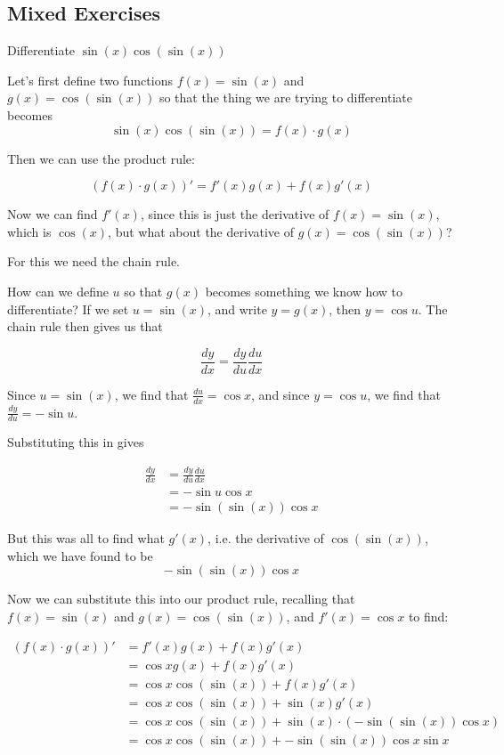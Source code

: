 \subsection{Mixed Exercises}
\begin{example}
    Differentiate $\sin(x)\cos(\sin(x))$
\end{example}
\begin{solution}
    Let's first define two functions $f(x) = \sin(x)$ and $g(x) = \cos(\sin(x))$ so that the thing we are trying to differentiate becomes
    \[ \sin(x)\cos(\sin(x)) = f(x) \cdot g(x)\]

    Then we can use the product rule:

    \[(f(x)\cdot g(x))' = f'(x)g(x) + f(x)g'(x)\]

    Now we can find $f'(x)$, since this is just the derivative of $f(x) = \sin(x)$, which is $\cos(x)$, but 
    what about the derivative of $g(x) = \cos(\sin(x))$?

    For this we need the chain rule.

    How can we define $u$ so that $g(x)$ becomes something we know how to differentiate? If we set $u = \sin(x)$, and write $y = g(x)$, then 
    $y = \cos u$. The chain rule then gives us that 

    \[ \frac{dy }{dx} = \frac{dy }{du}\frac{du}{dx}\]

    Since $u = \sin(x)$, we find that $\frac{du }{dx} = \cos x$, and since $y = \cos u$, we find that $\frac{dy}{du} = -\sin u$.

    Substituting this in gives 

    \begin{align*}
        \frac{dy}{dx} &= \frac{dy }{du}\frac{du}{dx} \\
         &= -\sin u \cos x \\
         &= -\sin (\sin(x)) \cos x \tag{using $u = \sin(x)$}
    \end{align*}

    But this was all to find what $g'(x)$, i.e. the derivative of $\cos(\sin(x))$, which we have found to be 
    \[ -\sin (\sin(x)) \cos x \]

    Now we can substitute this into our product rule, recalling that $f(x) = \sin(x)$ and $g(x) = \cos(\sin(x))$, and $f'(x) = \cos x$ to find:

    \begin{align*}
        (f(x)\cdot g(x))' &= f'(x)g(x) + f(x)g'(x) \\
         &=  \cos x g(x) + f(x) g'(x) \tag{substituting $f'(x)$} \\
         &= \cos x \cos(\sin(x)) + f(x) g'(x) \tag{substituting $g(x)$} \\
         &= \cos x \cos(\sin(x)) + \sin(x) g'(x) \tag{substituting $f(x)$} \\
         &= \cos x \cos(\sin(x)) + \sin(x)\cdot(-\sin (\sin(x)) \cos x) \tag{substituting $g'(x)$} \\
         &= \cos x \cos(\sin(x)) + -\sin (\sin(x)) \cos x \sin x
    \end{align*}


\end{solution}
